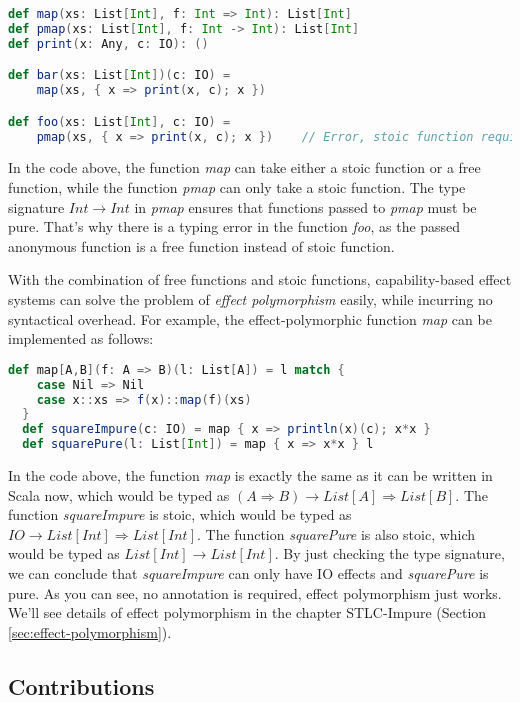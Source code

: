 \begin{lstlisting}[language=Scala]
def map(xs: List[Int], f: Int => Int): List[Int]
def pmap(xs: List[Int], f: Int -> Int): List[Int]
def print(x: Any, c: IO): ()

def bar(xs: List[Int])(c: IO) =
    map(xs, { x => print(x, c); x })

def foo(xs: List[Int], c: IO) =
    pmap(xs, { x => print(x, c); x })    // Error, stoic function required
\end{lstlisting}

In the code above, the function \emph{map} can take either a stoic
function or a free function, while the function \emph{pmap} can only
take a stoic function. The type signature $Int \to Int$ in \emph{pmap}
ensures that functions passed to \emph{pmap} must be pure. That's why
there is a typing error in the function \emph{foo}, as the passed
anonymous function is a free function instead of stoic function.

With the combination of free functions and stoic functions,
capability-based effect systems can solve the problem of \emph{effect
  polymorphism} easily, while incurring no syntactical overhead. For
example, the effect-polymorphic function \emph{map} can be implemented
as follows:

\begin{lstlisting}[language=Scala]
  def map[A,B](f: A => B)(l: List[A]) = l match {
    case Nil => Nil
    case x::xs => f(x)::map(f)(xs)
  }
  def squareImpure(c: IO) = map { x => println(x)(c); x*x }
  def squarePure(l: List[Int]) = map { x => x*x } l
\end{lstlisting}

In the code above, the function \emph{map} is exactly the same as it
can be written in Scala now, which would be typed as
$(A \Rightarrow B) \to List[A] \Rightarrow List[B]$. The function
\emph{squareImpure} is stoic, which would be typed as
$IO \to List[Int] \Rightarrow List[Int]$. The function
\emph{squarePure} is also stoic, which would be typed as
$List[Int] \to List[Int]$. By just checking the type signature, we can
conclude that \emph{squareImpure} can only have IO effects and
\emph{squarePure} is pure. As you can see, no annotation is required,
effect polymorphism just works. We'll see details of effect
polymorphism in the chapter STLC-Impure (Section
\ref{sec:effect-polymorphism}).

\subsection{Contributions}

